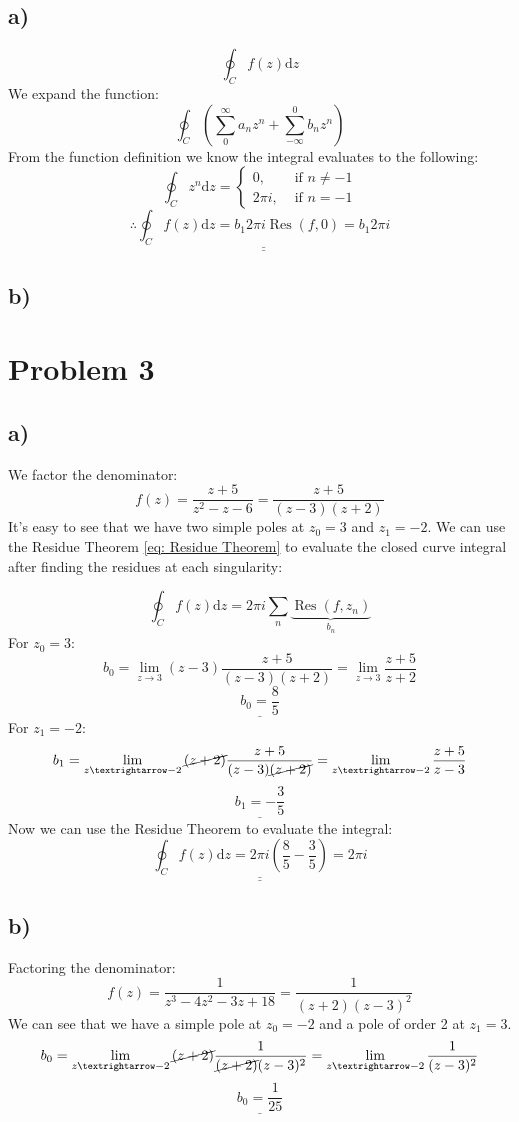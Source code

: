 \documentclass{article}
\begin{document}
\subsection*{a)}
\[
∮_{C} f(z) \mathrm{d}z 
\]
We expand the function:
\[
∮_{C} \left(∑_{0}^{∞} a_n z^{n} + ∑_{-∞}^{0} b_n z^{n}\right)
\]
From the function definition we know the integral evaluates to the following:
\[
∮_{C} z^{n} \mathrm{d}z = \begin{cases}
  0,   &\text{ if } n ≠ -1 \\
  2πi, &\text{ if } n = -1
\end{cases}
\]
\[
∴ \underline{\underline{∮_{C} f(z) \mathrm{d}z = b_1 2πi \operatorname{Res}(f, 0) = b_1 2πi }}
\]

\subsection*{b)}


\section*{Problem 3}
\subsection*{a)}
We factor the denominator:
\[
f(z) = \frac{z+5}{z^2 - z -6} = \frac{z+5}{(z-3)(z+2)}
\]
It's easy to see that we have two simple poles at $z_0 = 3$ and $z_1 = -2$. We can use the Residue Theorem \cref{eq: Residue Theorem} to evaluate the closed curve integral after finding the residues at each singularity:

\begin{equation}\label{eq: Residue Theorem}
∮_{C} f(z) \mathrm{d}z = 2πi ∑_{n}^{} \underbrace{\operatorname{Res}(f, z_n)}_{b_n}
\end{equation}
For $z_0 = 3$: 
\[
b_0 = \lim_{z → 3} (z-3) \frac{z+5}{(z-3)(z+2)} = \lim_{z → 3} \frac{z+5}{z+2} 
\]
\[
\underline{b_0 = \frac{8}{5}}
\]
For $z_1 = -2$:
\[
b_1 = \lim_{z → -2} \cancel{(z+2)} \frac{z+5}{(z-3)\cancel{(z+2)}} = \lim_{z → -2} \frac{z+5}{z-3}
\]
\[
\underline{b_1 = -\frac{3}{5}}
\]
Now we can use the Residue Theorem to evaluate the integral:
\[
\underline{\underline{∮_{C} f(z) \mathrm{d}z = 2πi \left(\frac{8}{5} - \frac{3}{5}\right) = 2πi}}
\]

\subsection*{b)}
Factoring the denominator:
\[
f(z) = \frac{1}{z^3 - 4z^2 - 3z + 18} = \frac{1}{(z+2)(z-3)^2}
\]
We can see that we have a simple pole at $z_0 = -2$ and a pole of order 2 at $z_1 = 3$. 
\[
b_0 = \lim_{z → -2} \cancel{(z+2)} \frac{1}{\cancel{(z+2)}(z-3)^2} = \lim_{z → -2} \frac{1}{(z-3)^2}
\]
\[
\underline{b_0 = \frac{1}{25}}
\]
\end{document}
